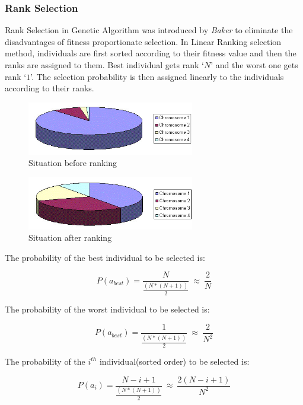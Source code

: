 \documentclass[a4paper, 12pt]{article}
\begin{document}
\subsubsection{Rank Selection}
Rank Selection in Genetic Algorithm was introduced by \textit{Baker} to eliminate the disadvantages of fitness proportionate selection. In Linear 
Ranking selection method, individuals are first sorted according to their fitness value and then the ranks are assigned to them. Best 
individual gets rank ‘$N$’ and the worst one gets rank ‘$1$’. The selection probability is then assigned linearly to the individuals according to 
their ranks.
\begin{figure}[h]
\centering
\includegraphics[width=0.65\textwidth, clip]{./rank.jpg}
\vspace{-0.15in}
\caption{Situation before ranking}
\label{fig:4}
\end{figure}
\begin{figure}[h]
\centering
\includegraphics[width=0.65\textwidth, clip]{./rank2.jpg}
\vspace{-0.15in}
\caption{Situation after ranking}
\label{fig:4}
\end{figure}
The probability of the best individual to be selected is:
\begin{large}
\boldmath\begin{equation*}
P\left(a_{best}\right) = \frac{N}{\frac{\left(N*\left(N+1\right)\right)}{2}}\ \approx\ \frac{2}{N}
\end{equation*}
\end{large}
The probability of the worst individual to be selected is:
\begin{large}
\boldmath\begin{equation*}
P\left(a_{best}\right) = \frac{1}{\frac{\left(N*\left(N+1\right)\right)}{2}}\ \approx\ \frac{2}{N^2}
\end{equation*}
\end{large}
The probability of the $i^{th}$ individual(sorted order) to be selected is:
\begin{large}
\boldmath\begin{equation*}
P\left(a_i\right) = \frac{N-i+1}{\frac{\left(N*\left(N+1\right)\right)}{2}}\ \approx\ \frac{2\left(N-i+1\right)}{N^2}
\end{equation*}
\end{large}
\end{document}
